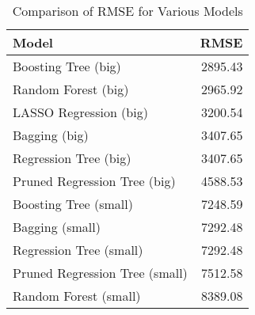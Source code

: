 \begin{table}[ht]
\centering
\caption{Comparison of RMSE for Various Models} 
\label{tab:rmse_comp}
\begin{tabular}{lr}
  \hline
Model & RMSE \\ 
  \hline
Boosting Tree (big) & 2895.43 \\ 
  Random Forest (big) & 2965.92 \\ 
  LASSO Regression (big) & 3200.54 \\ 
  Bagging (big) & 3407.65 \\ 
  Regression Tree (big) & 3407.65 \\ 
  Pruned Regression Tree (big) & 4588.53 \\ 
  Boosting Tree (small) & 7248.59 \\ 
  Bagging (small) & 7292.48 \\ 
  Regression Tree (small) & 7292.48 \\ 
  Pruned Regression Tree (small) & 7512.58 \\ 
  Random Forest (small) & 8389.08 \\ 
   \hline
\end{tabular}
\end{table}
